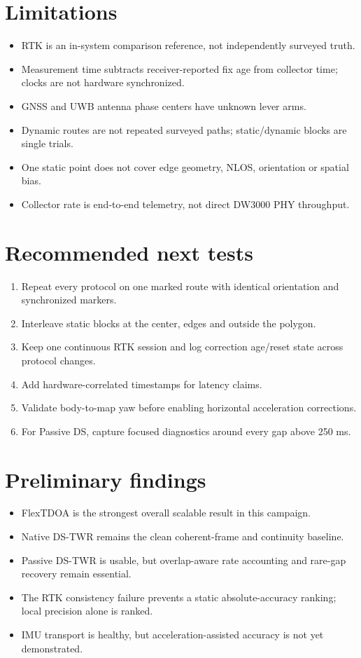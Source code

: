 \documentclass[10pt,a4paper]{article}
\begin{document}
\section{Limitations}
\begin{itemize}
\item RTK is an in-system comparison reference, not independently surveyed truth.
\item Measurement time subtracts receiver-reported fix age from collector time; clocks are not hardware synchronized.
\item GNSS and UWB antenna phase centers have unknown lever arms.
\item Dynamic routes are not repeated surveyed paths; static/dynamic blocks are single trials.
\item One static point does not cover edge geometry, NLOS, orientation or spatial bias.
\item Collector rate is end-to-end telemetry, not direct DW3000 PHY throughput.
\end{itemize}

\section{Recommended next tests}
\begin{enumerate}
\item Repeat every protocol on one marked route with identical orientation and synchronized markers.
\item Interleave static blocks at the center, edges and outside the polygon.
\item Keep one continuous RTK session and log correction age/reset state across protocol changes.
\item Add hardware-correlated timestamps for latency claims.
\item Validate body-to-map yaw before enabling horizontal acceleration corrections.
\item For Passive DS, capture focused diagnostics around every gap above 250 ms.
\end{enumerate}

\section{Preliminary findings}
\begin{itemize}
\item FlexTDOA is the strongest overall scalable result in this campaign.
\item Native DS-TWR remains the clean coherent-frame and continuity baseline.
\item Passive DS-TWR is usable, but overlap-aware rate accounting and rare-gap recovery remain essential.
\item The RTK consistency failure prevents a static absolute-accuracy ranking; local precision alone is ranked.
\item IMU transport is healthy, but acceleration-assisted accuracy is not yet demonstrated.
\end{itemize}
\end{document}
